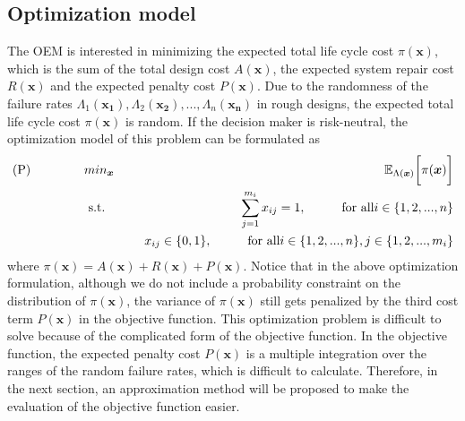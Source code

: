 \documentclass[preprint,12pt]{elsarticle}
\begin{document}
\subsection{Optimization model}
The OEM is interested in minimizing the expected total life cycle cost $\pi(\boldsymbol{x})$, which is the sum of the total design cost $A(\boldsymbol{x})$, the expected system repair cost $R(\boldsymbol{x})$ and the expected penalty cost $P(\boldsymbol{x})$. Due to the randomness of the failure rates $\Lambda_{1}(\boldsymbol{x_{1}}),\Lambda_{2}(\boldsymbol{x_{2}}),...,\Lambda_{n}(\boldsymbol{x_{n}})$ in rough designs, the expected total life cycle cost $\pi(\boldsymbol{x})$ is random. If the decision maker is risk-neutral, the optimization model of this problem can be formulated as
\begin{eqnarray}
\text{(P)} \hspace{15mm} & min_{\boldsymbol{x}} & \hspace{10mm} \mathbb{E}_{\Lambda(\boldsymbol{x})} \bigg[ \pi(\boldsymbol{x})\bigg] \nonumber\\
& \text{ s.t. }&  \hspace{5mm} \sum_{j=1}^{m_i}{x_{ij}}=1, \hspace{10mm} \text{for all} i \in \{1,2,...,n\} \nonumber\\
& & \hspace{5mm} x_{ij} \in \{0,1\}, \hspace{10mm}  \text{for all} i \in \{1,2,...,n\}, j \in \{1,2,...,m_i\}
\end{eqnarray}
where $\pi(\boldsymbol{x})=A(\boldsymbol{x})+R(\boldsymbol{x})+P(\boldsymbol{x})$. Notice that in the above optimization formulation, although we do not include a probability constraint on the distribution of $\pi(\boldsymbol{x})$, the variance of $\pi(\boldsymbol{x})$ still gets penalized by the third cost term $P(\boldsymbol{x})$ in the objective function. This optimization problem is difficult to solve because of the complicated form of the objective function. In the objective function, the expected penalty cost $P(\boldsymbol{x})$ is a multiple integration over the ranges of the random failure rates, which is difficult to calculate. Therefore, in the next section, an approximation method will be proposed to make the evaluation of the objective function easier.

%
\end{document}
